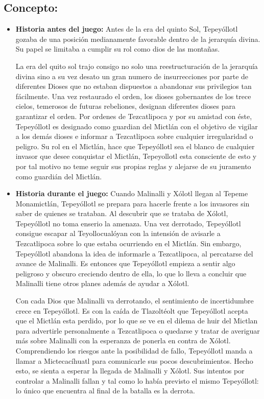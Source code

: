 \subsection{Concepto:}
\begin{itemize}
	\item \textbf{Historia antes del juego:}
	Antes de la era del quinto Sol, Tepeyóllotl gozaba de una posición medianamente favorable dentro de la jerarquía divina. Su papel se limitaba a cumplir su rol como dios de las montañas. 
	\\
	\par
	La era del quito sol trajo consigo no solo una reestructuración de la jerarquía divina sino a su vez desato un gran numero de insurrecciones por parte de diferentes Dioses que no estaban dispuestos a abandonar sus privilegios tan fácilmente. Una vez restaurado el orden, los dioses gobernantes de los trece cielos, temerosos de futuras rebeliones, designan diferentes dioses para garantizar el orden. Por ordenes de Tezcatlipoca y por su amistad con éste, Tepeyóllotl es designado como guardian del Mictlán con el objetivo de vigilar a los demás dioses e informar a Tezcatlipoca sobre cualquier irregularidad o peligro. Su rol en el Mictlán, hace que Tepeyóllotl sea el blanco de cualquier invasor que desee conquistar el Mictlán, Tepeyollotl esta consciente de esto y por tal motivo no teme seguir sus propias reglas y alejarse de su juramento como guardián del Mictlán.   
	\item \textbf{Historia durante el juego:}
	Cuando Malinalli y Xólotl llegan al Tepeme Monamictlán, Tepeyóllotl se prepara para hacerle frente a los invasores sin saber de quienes se trataban. Al descubrir que se trataba de Xólotl, Tepeyóllotl no toma enserio la amenaza. Una vez derrotado, Tepeyóllotl consigue escapar al Teyollocualóyan con la intensión de avisarle a Tezcatlipoca sobre lo que estaba ocurriendo en el Mictlán. Sin embargo, Tepeyóllotl abandona la idea de informarle a Tezcatlipoca, al percatarse del avance de Malinalli. Es entonces que Tepeyóllotl empieza a sentir algo peligroso y obscuro creciendo dentro de ella, lo que lo lleva a concluir que Malinalli tiene otros planes además de ayudar a Xólotl.
	\\
	\par
	Con cada Dios que Malinalli va derrotando, el sentimiento de incertidumbre crece en Tepeyóllotl. Es con la caída de Tlazoltéolt que Tepeyóllotl acepta que el Mictlán esta perdido, por lo que se ve en el dilema de huir del Mictlan para advertirle personalmente a Tezcatlipoca o quedarse y tratar de averiguar más sobre Malinalli con la esperanza de ponerla en contra de Xólotl. Comprendiendo los riesgos ante la posibilidad de fallo, Tepeyóllotl manda a llamar a Mictecacíhuatl para comunicarle sus pocos descubrimientos. Hecho esto, se sienta a esperar la llegada de Malinalli y Xólotl. Sus intentos por controlar a Malinalli fallan y tal como lo había previsto el mismo Tepeyóllotl: lo único que encuentra al final de la batalla es la derrota.  

\end{itemize}
